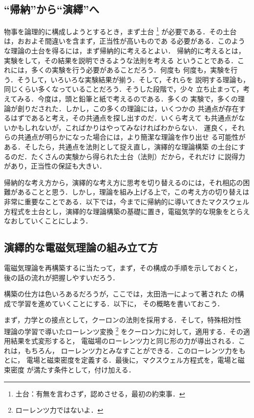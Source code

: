         \subsection{“帰納”から“演繹”へ}
        物事を論理的に構成しようとするとき，まず土台
            \footnote{
                土台：有無を言わさず，認めさせる，最初の約束事．
            }
        が必要である．その土台は，おおよそ間違いを含まず，正当性が高いものであ
        る必要がある．このような理論の土台を得るには，まず帰納的に考えるとよい．
        帰納的に考えるとは，実験をして，その結果を説明できるような法則を考える
        ということである．これには，多くの実験を行う必要があることだろう．何度も
        何度も，実験を行う．そうして，いろいろな実験結果が揃う．そして，それらを
        説明する理論も，同じくらい多くなっていることだろう．そうした段階で，少々
        立ち止まって，考えてみる．今度は，頭と鉛筆と紙で考えるのである．多くの
        実験で，多くの理論が創りだされた．しかし，この多くの理論には，いくつかの
        共通点が存在するはずであると考え，その共通点を探し出すのだ．いくら考えて
        も共通点がないかもしれないが，こればかりはやってみなければわからない．
        運良く，それらの共通点が明らかになった場合には，より簡潔な理論を作り出せ
        る可能性がある．そしたら，共通点を法則として捉え直し，演繹的な理論構築
        の土台にするのだ．たくさんの実験から得られた土台（法則）だから，それだけ
        に説得力があり，正当性の保証も大きい．

        帰納的な考え方から，演繹的な考え方に思考を切り替えるのには，それ相応の困
        難があることと思う．しかし，理論を組み上げる上で，この考え方の切り替えは
        非常に重要なことである．以下では，今までに帰納的に導いてきたマクスウェル
        方程式を土台とし，演繹的な理論構築の基礎に置き，電磁気学的な現象をとらえ
        なおしていくことにしよう．

        \subsection{演繹的な電磁気理論の組み立て方}
        電磁気理論を再構築するに当たって，まず，その構成の手順を示しておくと，
        後の話の流れが把握しやすいだろう．

        構築の仕方は色いろあるだろうが，ここでは，太田浩一によって著された
        \cite{bib:refbook_em_5}の構成で学習を進めていくことにする．以下に，
        その概略を書いておこう．

        まず，力学との接点として，クーロンの法則を採用する．そして，特殊相対性
        理論の学習で導いたローレンツ変換
            \footnote{
                ローレンツ力ではないよ．
            }
        をクーロン力に対して，適用する．その適用結果を式変形すると，
        電磁場のローレンツ力と同じ形の力が導出される．これは，もちろん，
        ローレンツ力とみなすことができる．このローレンツ力をもとに，
        電場と磁束密度を定義する．最後に，マクスウェル方程式を，電場と磁束密度
        が満たす条件として，付け加える．

